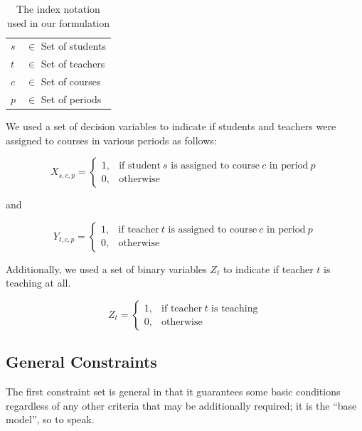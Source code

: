 \documentclass[12pt]{article}
\begin{document}
\begin{table}[]
\centering
\caption{The index notation used in our formulation}
\label{tab:index-notation}
\begin{tabular}{ll}
\hline
$s$ & $\in$ Set of students \\
$t$ & $\in$ Set of teachers \\
$c$ & $\in$ Set of courses \\
$p$ & $\in$ Set of periods \\
\hline
\end{tabular}
\end{table}

We used a set of decision variables to indicate if students and teachers were assigned to courses in various periods as follows:

\begin{equation}
	X_{s,c,p} = 
	\begin{cases}
		1, & \text{if student}\ s \text{ is assigned to course}\ c \text{ in period}\ p	\\
		0, & \text{otherwise}
	\end{cases}
\end{equation}

and

\begin{equation}
	Y_{t,c,p} = 
	\begin{cases}
		1, & \text{if teacher}\ t \text{ is assigned to course}\ c \text{ in period}\ p	\\
		0, & \text{otherwise}
	\end{cases}
\end{equation}

Additionally, we used a set of binary variables $Z_{t}$ to indicate if teacher $t$ is teaching at all.

\begin{equation}
	Z_{t} = 
	\begin{cases}
		1, & \text{if teacher}\ t \text{ is teaching}	\\
		0, & \text{otherwise}
	\end{cases}
\end{equation}


\subsection{General Constraints}

The first constraint set is general in that it guarantees some basic conditions regardless of any other criteria that may be additionally required; it is the ``base model'', so to speak.
\end{document}
